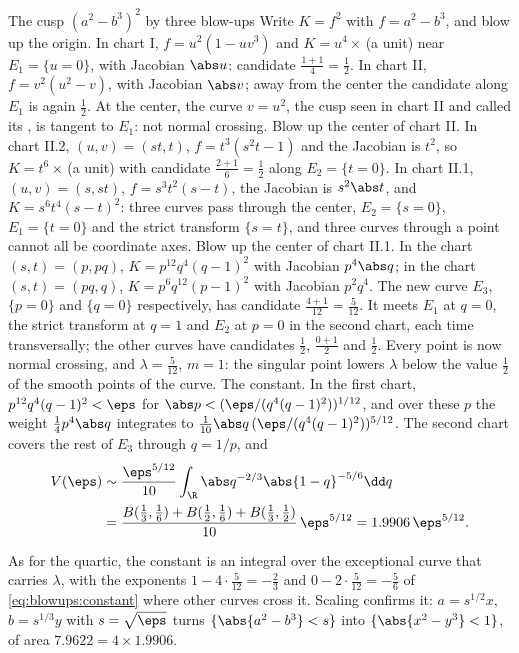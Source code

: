 \begin{refsection}
\begin{computation}{The cusp $(a^2-b^3)^2$ by three blow-ups}\label{comp:blowups:cusp}
\step Write $K=f^2$ with $f=a^2-b^3$, and blow up the origin. In chart I, $f=u^2(1-uv^3)$ and $K=u^4\times$\,(a unit) near $E_1=\{u=0\}$, with Jacobian $\abs u$: candidate $\frac{1+1}4=\frac12$. In chart II, $f=v^2(u^2-v)$, with Jacobian $\abs v$; away from the center the candidate along $E_1$ is again $\frac12$. At the center, the curve $v=u^2$, the cusp seen in chart II and called its , is tangent to $E_1$: not normal crossing.
\step Blow up the center of chart II. In chart II.2, $(u,v)=(st,t)$, $f=t^3(s^2t-1)$ and the Jacobian is $t^2$, so $K=t^6\times$\,(a unit) with candidate $\frac{2+1}6=\frac12$ along $E_2=\{t=0\}$. In chart II.1, $(u,v)=(s,st)$, $f=s^3t^2(s-t)$, the Jacobian is $s^2\abs t$, and $K=s^6t^4(s-t)^2$: three curves pass through the center, $E_2=\{s=0\}$, $E_1=\{t=0\}$ and the strict transform $\{s=t\}$, and three curves through a point cannot all be coordinate axes.
\step Blow up the center of chart II.1. In the chart $(s,t)=(p,pq)$, $K=p^{12}q^4(q-1)^2$ with Jacobian $p^4\abs q$; in the chart $(s,t)=(pq,q)$, $K=p^6q^{12}(p-1)^2$ with Jacobian $p^2q^4$. The new curve $E_3$, $\{p=0\}$ and $\{q=0\}$ respectively, has candidate $\frac{4+1}{12}=\frac5{12}$. It meets $E_1$ at $q=0$, the strict transform at $q=1$ and $E_2$ at $p=0$ in the second chart, each time transversally; the other curves have candidates $\frac12$, $\frac{0+1}2$ and $\frac12$.
\step Every point is now normal crossing, and $\lambda=\frac5{12}$, $m=1$: the singular point lowers $\lambda$ below the value $\frac12$ of the smooth points of the curve.
\step The constant. In the first chart, $p^{12}q^4(q-1)^2<\eps$ for $\abs p<(\eps/(q^4(q-1)^2))^{1/12}$, and over these $p$ the weight $\frac14p^4\abs q$ integrates to $\frac1{10}\abs q\,(\eps/(q^4(q-1)^2))^{5/12}$. The second chart covers the rest of $E_3$ through $q=1/p$, and
\[
\begin{aligned}
V(\eps)&\sim\frac{\eps^{5/12}}{10}\int_\R\abs q^{-2/3}\abs{1-q}^{-5/6}\dd q\\
&=\frac{B(\frac13,\frac16)+B(\frac12,\frac16)+B(\frac13,\frac12)}{10}\,\eps^{5/12}=1.9906\,\eps^{5/12}.
\end{aligned}
\]
\end{computation}

As for the quartic, the constant is an integral over the exceptional curve that carries $\lambda$, with the exponents $1-4\cdot\frac5{12}=-\frac23$ and $0-2\cdot\frac5{12}=-\frac56$ of \eqref{eq:blowups:constant} where other curves cross it. Scaling confirms it: $a=s^{1/2}x$, $b=s^{1/3}y$ with $s=\sqrt\eps$ turns $\{\abs{a^2-b^3}<s\}$ into $\{\abs{x^2-y^3}<1\}$, of area $7.9622=4\times1.9906$.


\end{refsection}
